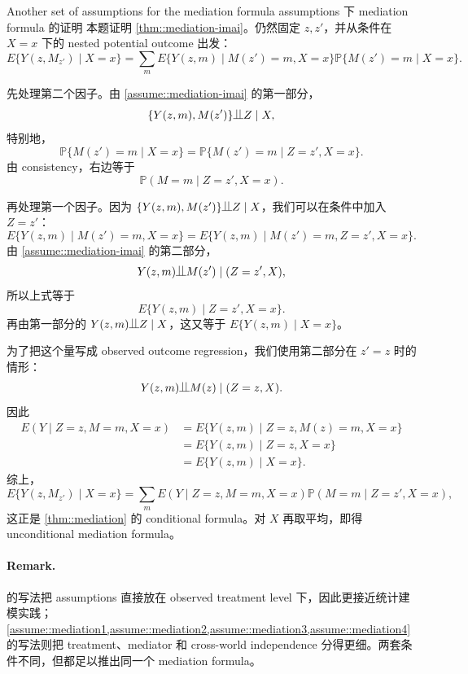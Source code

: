\begin{exercisesolution}{Another set of assumptions for the mediation formula}{\citet{Imai::2010} assumptions 下 mediation formula 的证明}
本题证明 \cref{thm::mediation-imai}。仍然固定 $z,z'$，并从条件在 $X=x$ 下的 nested potential outcome 出发：
\[
E\{Y(z,M_{z'})\mid X=x\}
=
\sum_m E\{Y(z,m)\mid M(z')=m,X=x\}\mathbb{P}\{M(z')=m\mid X=x\}.
\]

先处理第二个因子。由 \cref{assume::mediation-imai} 的第一部分，
\[
\{Y(z,m),M(z')\}\ind Z\mid X,
\]
特别地，
\[
\mathbb{P}\{M(z')=m\mid X=x\}
=
\mathbb{P}\{M(z')=m\mid Z=z',X=x\}.
\]
由 consistency，右边等于
\[
\mathbb{P}(M=m\mid Z=z',X=x).
\]

再处理第一个因子。因为 $\{Y(z,m),M(z')\}\ind Z\mid X$，我们可以在条件中加入 $Z=z'$：
\[
E\{Y(z,m)\mid M(z')=m,X=x\}
=
E\{Y(z,m)\mid M(z')=m,Z=z',X=x\}.
\]
由 \cref{assume::mediation-imai} 的第二部分，
\[
Y(z,m)\ind M(z')\mid (Z=z',X),
\]
所以上式等于
\[
E\{Y(z,m)\mid Z=z',X=x\}.
\]
再由第一部分的 $Y(z,m)\ind Z\mid X$，这又等于 $E\{Y(z,m)\mid X=x\}$。

为了把这个量写成 observed outcome regression，我们使用第二部分在 $z'=z$ 时的情形：
\[
Y(z,m)\ind M(z)\mid (Z=z,X).
\]
因此
\begin{align*}
E(Y\mid Z=z,M=m,X=x)
&=
E\{Y(z,m)\mid Z=z,M(z)=m,X=x\}\\
&=
E\{Y(z,m)\mid Z=z,X=x\}\\
&=
E\{Y(z,m)\mid X=x\}.
\end{align*}
综上，
\[
E\{Y(z,M_{z'})\mid X=x\}
=
\sum_m E(Y\mid Z=z,M=m,X=x)\mathbb{P}(M=m\mid Z=z',X=x),
\]
这正是 \cref{thm::mediation} 的 conditional formula。对 $X$ 再取平均，即得 unconditional mediation formula。

\paragraph{Remark.}
\citet{Imai::2010} 的写法把 assumptions 直接放在 observed treatment level 下，因此更接近统计建模实践；\cref{assume::mediation1,assume::mediation2,assume::mediation3,assume::mediation4} 的写法则把 treatment、mediator 和 cross-world independence 分得更细。两套条件不同，但都足以推出同一个 mediation formula。
\end{exercisesolution}

